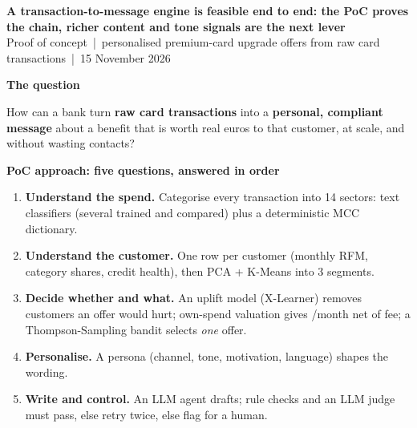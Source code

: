 \documentclass[8pt,a4paper]{extarticle}
\newcommand{\eur}{\texteuro}
\newcommand{\sect}[1]{{\color{navy}\bfseries\small #1}\par\vspace{-3pt}{\color{navy}\rule{\linewidth}{0.6pt}}\par\vspace{1pt}}
\begin{document}
\begin{tcolorbox}[colback=navy,colframe=navy,boxrule=0pt,arc=2pt,left=6pt,right=6pt,top=4pt,bottom=4pt]
{\color{white}\bfseries\large A transaction-to-message engine is feasible end to end: the PoC proves the chain, richer content and tone signals are the next lever}\\[2pt]
{\color{white!80!navy}\footnotesize Proof of concept \,|\, personalised premium-card upgrade offers from raw card transactions \,|\, 15 November 2026}
\end{tcolorbox}
\vspace{-3pt}

\begin{minipage}[t]{0.605\textwidth}
\sect{The question}
How can a bank turn \textbf{raw card transactions} into a \textbf{personal, compliant message} about a benefit that is worth real euros to that customer, at scale, and without wasting contacts?

\vspace{4pt}
\sect{PoC approach: five questions, answered in order}
\begin{enumerate}[label=\textbf{\arabic*.},leftmargin=11pt]
\item \textbf{Understand the spend.} Categorise every transaction into 14 sectors: text classifiers (several trained and compared) plus a deterministic MCC dictionary.
\item \textbf{Understand the customer.} One row per customer (monthly RFM, category shares, credit health), then PCA + K-Means into 3 segments.
\item \textbf{Decide whether and what.} An uplift model (X-Learner) removes customers an offer would hurt; own-spend valuation gives \eur/month net of fee; a Thompson-Sampling bandit selects \emph{one} offer.
\item \textbf{Personalise.} A persona (channel, tone, motivation, language) shapes the wording.
\item \textbf{Write and control.} An LLM agent drafts; rule checks and an LLM judge must pass, else retry twice, else flag for a human.
\end{enumerate}
\end{minipage}\hfill
\end{document}
